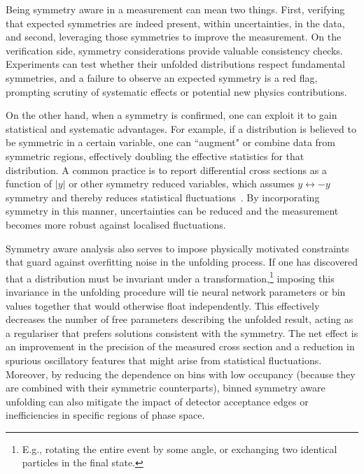 

        Being symmetry aware in a measurement can mean two things.
        First, verifying that expected symmetries are indeed present, within uncertainties, in the data, and second, leveraging those symmetries to improve the measurement.
        On the verification side, symmetry considerations provide valuable consistency checks.
        Experiments can test whether their unfolded distributions respect fundamental symmetries, and a failure to observe an expected symmetry is a red flag, prompting scrutiny of systematic effects or potential new physics contributions.

        On the other hand, when a symmetry is confirmed, one can exploit it to gain statistical and systematic advantages.
        For example, if a distribution is believed to be symmetric in a certain variable, one can ``augment" or combine data from symmetric regions, effectively doubling the effective statistics for that distribution.
        A common practice is to report differential cross sections as a function of $|y|$ or other symmetry reduced variables, which assumes $y \leftrightarrow -y$ symmetry and thereby reduces statistical fluctuations~\cite{CMS:2013zfg, ATLAS:2014rjv, ATLAS:2016vlf}.
        By incorporating symmetry in this manner, uncertainties can be reduced and the measurement becomes more robust against localised fluctuations.

        Symmetry aware analysis also serves to impose physically motivated constraints that guard against overfitting noise in the unfolding process.
        If one has discovered that a distribution must be invariant under a transformation,\footnote{E.g., rotating the entire event by some angle, or exchanging two identical particles in the final state.} imposing this invariance in the unfolding procedure will tie neural network parameters or bin values together that would otherwise float independently.
        This effectively decreases the number of free parameters describing the unfolded result, acting as a regulariser that prefers solutions consistent with the symmetry.
        The net effect is an improvement in the precision of the measured cross section and a reduction in spurious oscillatory features that might arise from statistical fluctuations.
        Moreover, by reducing the dependence on bins with low occupancy (because they are combined with their symmetric counterparts), binned symmetry aware unfolding can also mitigate the impact of detector acceptance edges or inefficiencies in specific regions of phase space.

